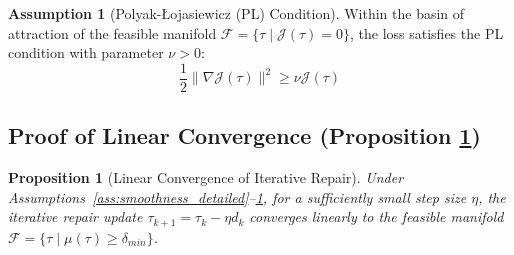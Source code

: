 \documentclass{article}
\theoremstyle{plain}
\newtheorem{proposition}[theorem]{Proposition}
\theoremstyle{definition}
\newtheorem{assumption}[theorem]{Assumption}
\theoremstyle{remark}
\begin{document}
\begin{assumption}[Polyak-Łojasiewicz (PL) Condition]
    \label{ass:pl_detailed}
    Within the basin of attraction of the feasible manifold $\mathcal{F} = \{ \tau \mid \mathcal{J}(\tau) = 0 \}$, the loss satisfies the PL condition with parameter $\nu > 0$:
    \begin{equation}
        \frac{1}{2} \| \nabla \mathcal{J}(\tau) \|^2 \ge \nu \mathcal{J}(\tau)
    \end{equation}
\end{assumption}

\subsection{Proof of Linear Convergence (Proposition \ref{prop:convergence})}

\begin{proposition}[Linear Convergence of Iterative Repair]
\label{prop:convergence}
Under Assumptions~\ref{ass:smoothness_detailed}--\ref{ass:pl_detailed}, for a sufficiently small step size $\eta$, the iterative repair update $\tau_{k+1} = \tau_k - \eta d_k$ converges linearly to the feasible manifold $\mathcal{F} = \{\tau \mid \mu(\tau) \ge \delta_{min}\}$.
\end{proposition}
\end{document}
